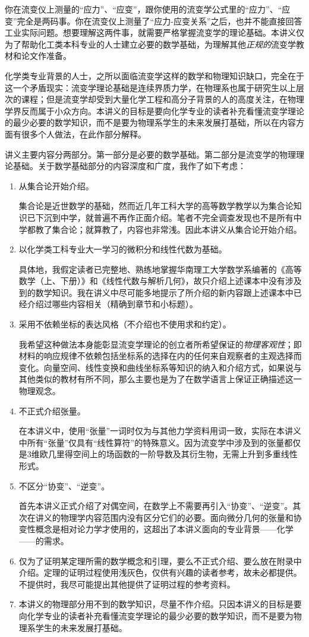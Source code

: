 \documentclass[main.tex]{subfiles}
\begin{document}
你在流变仪上测量的“应力”、“应变”，跟你使用的流变学公式里的“应力”、“应变”完全是两码事。你在流变仪上测量了“应力-应变关系”之后，也并不能直接回答工业实际问题。想要理解这两件事，就需要严格掌握流变学的理论基础。本讲义仅为了帮助化工类本科专业的人士建立必要的数学基础，为理解其他\emph{正规的}流变学教材和论文作准备。

化学类专业背景的人士，之所以面临流变学这样的数学和物理知识缺口，完全在于这一个矛盾现实：流变学理论基础是连续界质力学，在物理系也属于研究生以上层次的课程；但是流变学却受到大量化学工程和高分子背景的人的高度关注，在物理学界反而属于小众方向。本讲义的目标是要向化学专业的读者补充看懂流变学理论的最少必要的数学知识，而不是要为物理系学生的未来发展打基础，所以在内容方面有很多个人做法，在此作部分解释。

讲义主要内容分两部分。第一部分是必要的数学基础。第二部分是流变学的物理理论基础。关于数学基础部分的内容深度和广度，我作了如下考虑：
\begin{enumerate}
    \item 从集合论开始介绍。
    
    集合论是近世数学的基础，然而近几年工科大学的高等数学教学以为集合论知识已下沉到中学，就普遍不再作正面介绍。笔者不完全调查发现也不是所有中学都教了集合论；就算教了，内容也非常浅。因此本讲义从集合论开始介绍。
    \item 以化学类工科专业大一学习的微积分和线性代数为基础。
    
    具体地，我假定读者已完整地、熟练地掌握华南理工大学数学系编著的《高等数学（上、下册）》和《线性代数与解析几何》，故只介绍上述课本中没有涉及到的数学知识。我在讲义中尽可能多地提示了所介绍的新内容跟上述课本中已经介绍过哪些内容相关（精确到章节和小标题）。
    \item 采用不依赖坐标的表达风格（不介绍也不使用求和约定）。
    
    我希望这种做法本身能彰显流变学理论的创立者所希望保证的\emph{物理客观性}；即材料的响应规律不依赖包括坐标系的选择在内的任何来自观察者的主观选择而变化。向量空间、线性变换和曲线坐标系等知识的纳入和介绍方式，如果说与其他类似的教材有所不同，那么主要也是为了在数学语言上保证正确描述这一物理观念。
    \item 不正式介绍张量。
    
    在本讲义中，使用“张量”一词时仅为与其他力学资料用词一致，实际在本讲义中所有“张量”仅具有“线性算符”的特殊意义。因为流变学中涉及到的张量都仅是3维欧几里得空间上的场函数的一阶导数及其衍生物，无需上升到多重线性形式。
    \item 不区分“协变”、“逆变”。
    
    首先本讲义正式介绍了对偶空间，在数学上不需要再引入“协变”、“逆变”。其次在讲义的物理学内容范围内没有区分它们的必要。面向微分几何的张量和协变性概念是相对论力学才使用的，这超出了本讲义面向的专业背景——化学——的需求。    
    \item 仅为了证明某定理所需的数学概念和引理，要么不正式介绍、要么放在附录中介绍。定理的证明过程使用浅灰色，仅供有兴趣的读者参考，故未必都提供。不提供时，我尽可能提出其他提供了证明过程的参考资料。
    \item 本讲义的物理部分用不到的数学知识，尽量不作介绍。只因本讲义的目标是要向化学专业的读者补充看懂流变学理论的最少必要的数学知识，而不是要为物理系学生的未来发展打基础。
\end{enumerate}
\end{document}
